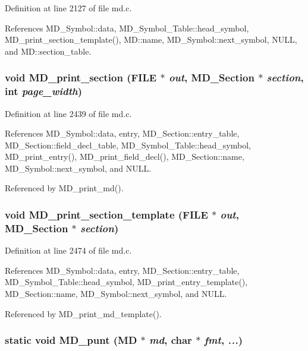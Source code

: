 Definition at line 2127 of file md.c.

References MD\_\-Symbol::data, MD\_\-Symbol\_\-Table::head\_\-symbol, MD\_\-print\_\-section\_\-template(), MD::name, MD\_\-Symbol::next\_\-symbol, NULL, and MD::section\_\-table.
\subsubsection{\setlength{\rightskip}{0pt plus 5cm}void MD\_\-print\_\-section (FILE $\ast$ {\em out}, \bf{MD\_\-Section} $\ast$ {\em section}, int {\em page\_\-width})}\label{md_8c_217d18bf9ce0a2e4033baeea403c5943}




Definition at line 2439 of file md.c.

References MD\_\-Symbol::data, entry, MD\_\-Section::entry\_\-table, MD\_\-Section::field\_\-decl\_\-table, MD\_\-Symbol\_\-Table::head\_\-symbol, MD\_\-print\_\-entry(), MD\_\-print\_\-field\_\-decl(), MD\_\-Section::name, MD\_\-Symbol::next\_\-symbol, and NULL.

Referenced by MD\_\-print\_\-md().
\subsubsection{\setlength{\rightskip}{0pt plus 5cm}void MD\_\-print\_\-section\_\-template (FILE $\ast$ {\em out}, \bf{MD\_\-Section} $\ast$ {\em section})}\label{md_8c_5f1363196bcb1701bd18fbceee1495d7}




Definition at line 2474 of file md.c.

References MD\_\-Symbol::data, entry, MD\_\-Section::entry\_\-table, MD\_\-Symbol\_\-Table::head\_\-symbol, MD\_\-print\_\-entry\_\-template(), MD\_\-Section::name, MD\_\-Symbol::next\_\-symbol, and NULL.

Referenced by MD\_\-print\_\-md\_\-template().
\subsubsection{\setlength{\rightskip}{0pt plus 5cm}static void MD\_\-punt (\bf{MD} $\ast$ {\em md}, char $\ast$ {\em fmt},  {\em ...})\hspace{0.3cm}{\tt  [static]}}\label{md_8c_e1718bf74e2444914593fcec344bc35c}




